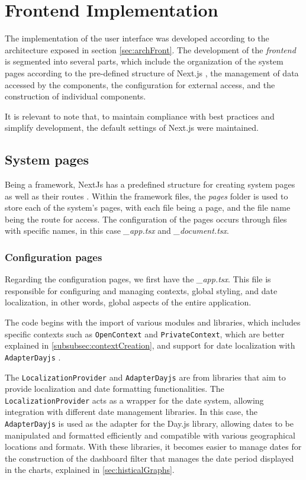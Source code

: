 \section[Frontend Implementation]{Frontend Implementation}\label{sec:implFront}

The implementation of the user interface was developed according to the architecture exposed in section \ref{sec:archFront}. The development of the \textit{frontend} is segmented into several parts, which include the organization of the system pages according to the pre-defined structure of Next.js \cite{nextjsDocs}, the management of data accessed by the components, the configuration for external access, and the construction of individual components.

It is relevant to note that, to maintain compliance with best practices and simplify development, the default settings of Next.js were maintained.

\subsection{System pages}\label{subsec:}
Being a framework, NextJs has a predefined structure for creating system pages as well as their routes \cite{nextjsDefiningRoutes}. Within the framework files, the \textit{pages} folder is used to store each of the system's pages, with each file being a page, and the file name being the route for access. The configuration of the pages occurs through files with specific names, in this case \textit{\_app.tsx} and \textit{\_document.tsx}.

\subsubsection{Configuration pages}\label{subsec:configPage}
Regarding the configuration pages, we first have the \textit{\_app.tsx}. This file is responsible for configuring and managing contexts, global styling, and date localization, in other words, global aspects of the entire application.

The code begins with the import of various modules and libraries, which includes specific contexts such as \texttt{OpenContext} and \texttt{PrivateContext}, which are better explained in \ref{subsubsec:contextCreation}, and support for date localization with \texttt{AdapterDayjs} \cite{dayJsInstallation}.

The \texttt{LocalizationProvider} and \texttt{AdapterDayjs} are from libraries that aim to provide localization and date formatting functionalities. The \texttt{LocalizationProvider} acts as a wrapper for the date system, allowing integration with different date management libraries. In this case, the \texttt{AdapterDayjs} is used as the adapter for the Day.js library, allowing dates to be manipulated and formatted efficiently and compatible with various geographical locations and formats. With these libraries, it becomes easier to manage dates for the construction of the dashboard filter that manages the date period displayed in the charts, explained in \ref{sec:histicalGraphs}.

